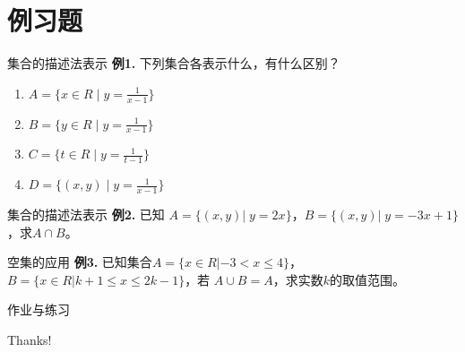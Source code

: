 \documentclass[10pt,
	aspectratio=169,%
	hyperref={colorlinks,
		citecolor=peking_blue,
		urlcolor=peking_blue,
		linkcolor=},
	t,%
	]{beamer}
\theoremstyle{plain}
\begin{document}
\section{例习题}

\begin{frame}[t]{集合的描述法表示}
	\textbf{例1.} 下列集合各表示什么，有什么区别？
	\begin{enumerate}
		\item $A = \{ x \in R \;| \; y = \frac{1}{x-1}\}$
		\item $B = \{ y \in R \; | \; y = \frac{1}{x-1}\}$
		\item $C = \{ t \in R \; | \; y = \frac{1}{t-1}\}$
		\item $D = \{ (x,y) \; | \; y = \frac{1}{x-1}\}$
	\end{enumerate}

\end{frame}

\begin{frame}[t]{集合的描述法表示}
	\textbf{例2.} 已知 $A = \{ (x,y) | \;y = 2x\}$，$B = \{ (x,y) | \;y = -3x + 1\}$，求$A \cap B$。
\end{frame}

\begin{frame}[t]{空集的应用}%
	\textbf{例3.} 已知集合$A = \{ x \in R | -3 < x \leq 4\}$，$B = \{ x \in R | k + 1 \leq x \leq 2k-1\}$，若 $A \cup B = A$，求实数$k$的取值范围。
	
	\vfill\textsf{}
	
	\null

\end{frame}

\begin{frame}{作业与练习}
	
\end{frame}

\begin{frame}[c]
    \begin{center}
        {\Huge\calligra Thanks!}
    \end{center}
\end{frame}
\end{document}
